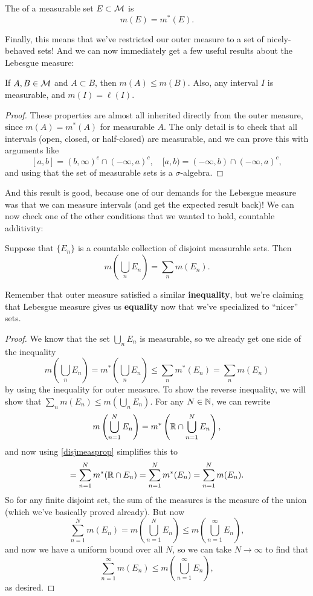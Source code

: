 \begin{definition}
The  of a measurable set $E \subset \mathcal{M}$ is
\[
    m(E) = m^\ast(E).
\]
\end{definition}

Finally, this means that we've restricted our outer measure to a set of nicely-behaved sets! And we can now immediately get a few useful results about the Lebesgue measure:

\begin{proposition}
If $A, B \in \mathcal{M}$ and $A \subset B$, then $m(A) \le m(B)$. Also, any interval $I$ is measurable, and $m(I) = \ell(I)$.
\end{proposition}
\begin{proof}
These properties are almost all inherited directly from the outer measure, since $m(A) = m^\ast(A)$ for measurable $A$. The only detail is to check that all intervals (open, closed, or half-closed) are measurable, and we can prove this with arguments like
\[
    [a, b] = (b, \infty)^c \cap (-\infty, a)^c, \quad [a, b) = (-\infty, b) \cap (-\infty, a)^c,
\]
and using that the set of measurable sets is a $\sigma$-algebra. 
\end{proof}

And this result is good, because one of our demands for the Lebesgue measure was that we can measure intervals (and get the expected result back)! We can now check one of the other conditions that we wanted to hold, countable additivity:

\begin{theorem}
Suppose that $\{E_n\}$ is a countable collection of disjoint measurable sets. Then 
\[
    m\left(\bigcup_n E_n\right) = \sum_n m(E_n).
\]
\end{theorem}

Remember that outer measure satisfied a similar \textbf{inequality}, but we're claiming that Lebesgue measure gives us \textbf{equality} now that we've specialized to ``nicer'' sets.

\begin{proof}
We know that the set $\bigcup_n E_n$ is measurable, so we already get one side of the inequality
\[
    m\left(\bigcup_n E_n\right) = m^\ast\left(\bigcup_n E_n\right) \le \sum_n m^\ast(E_n) = \sum_n m(E_n)
\]
by using the inequality for outer measure. To show the reverse inequality, we will show that $\sum_n m(E_n) \le m\left(\bigcup_n E_n\right)$. For any $N \in \mathbb N$, we can rewrite
\[
    m\left(\bigcup_{n=1}^N E_n\right) = m^\ast \left(\mathbb R \cap \bigcup_{n=1}^N E_n\right),
\]
and now using \cref{disjmeasprop} simplifies this to 
\[
    = \sum_{n=1}^N m^\ast( \mathbb R \cap E_n) = \sum_{n=1}^N m^\ast(E_n) = \sum_{n=1}^N m(E_n). 
\]
So for any finite disjoint set, the sum of the measures is the measure of the union (which we've basically proved already). But now 
\[
    \sum_{n=1}^{N} m(E_n) = m \left(\bigcup_{n=1}^N E_n\right) \le m \left(\bigcup_{n=1}^\infty E_n\right),
\]
and now we have a uniform bound over all $N$, so we can take $N \to \infty$ to find that 
\[
    \sum_{n=1}^{\infty} m(E_n) \le m\left(\bigcup_{n=1}^{\infty} E_n\right),
\]
as desired. 
\end{proof}

